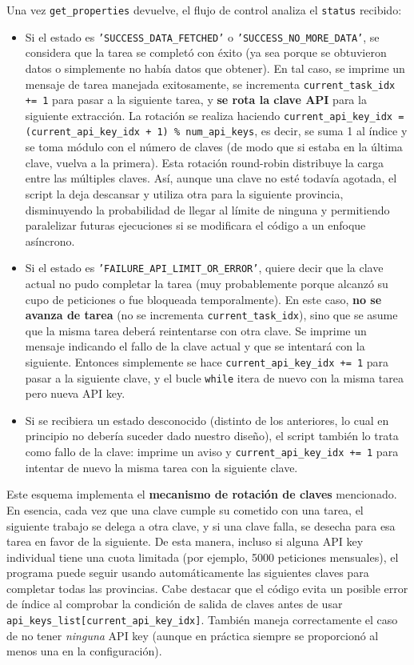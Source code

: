\documentclass[a4paper,11pt]{book}
\begin{document}
Una vez \texttt{get\_properties} devuelve, el flujo de control analiza el \texttt{status} recibido:
\begin{itemize}
    \item Si el estado es \texttt{'SUCCESS\_DATA\_FETCHED'} o \texttt{'SUCCESS\_NO\_MORE\_DATA'}, se considera que la tarea se completó con éxito (ya sea porque se obtuvieron datos o simplemente no había datos que obtener). En tal caso, se imprime un mensaje de tarea manejada exitosamente, se incrementa \texttt{current\_task\_idx += 1} para pasar a la siguiente tarea, y \textbf{se rota la clave API} para la siguiente extracción. La rotación se realiza haciendo \texttt{current\_api\_key\_idx = (current\_api\_key\_idx + 1) \% num\_api\_keys}, es decir, se suma 1 al índice y se toma módulo con el número de claves (de modo que si estaba en la última clave, vuelva a la primera). Esta rotación round-robin distribuye la carga entre las múltiples claves. Así, aunque una clave no esté todavía agotada, el script la deja descansar y utiliza otra para la siguiente provincia, disminuyendo la probabilidad de llegar al límite de ninguna y permitiendo paralelizar futuras ejecuciones si se modificara el código a un enfoque asíncrono.
    \item Si el estado es \texttt{'FAILURE\_API\_LIMIT\_OR\_ERROR'}, quiere decir que la clave actual no pudo completar la tarea (muy probablemente porque alcanzó su cupo de peticiones o fue bloqueada temporalmente). En este caso, \textbf{no se avanza de tarea} (no se incrementa \texttt{current\_task\_idx}), sino que se asume que la misma tarea deberá reintentarse con otra clave. Se imprime un mensaje indicando el fallo de la clave actual y que se intentará con la siguiente. Entonces simplemente se hace \texttt{current\_api\_key\_idx += 1} para pasar a la siguiente clave, y el bucle \texttt{while} itera de nuevo con la misma tarea pero nueva API key.
    \item Si se recibiera un estado desconocido (distinto de los anteriores, lo cual en principio no debería suceder dado nuestro diseño), el script también lo trata como fallo de la clave: imprime un aviso y \texttt{current\_api\_key\_idx += 1} para intentar de nuevo la misma tarea con la siguiente clave.
\end{itemize}

Este esquema implementa el \textbf{mecanismo de rotación de claves} mencionado. En esencia, cada vez que una clave cumple su cometido con una tarea, el siguiente trabajo se delega a otra clave, y si una clave falla, se desecha para esa tarea en favor de la siguiente. De esta manera, incluso si alguna API key individual tiene una cuota limitada (por ejemplo, 5000 peticiones mensuales), el programa puede seguir usando automáticamente las siguientes claves para completar todas las provincias. Cabe destacar que el código evita un posible error de índice al comprobar la condición de salida de claves antes de usar \texttt{api\_keys\_list[current\_api\_key\_idx]}. También maneja correctamente el caso de no tener \textit{ninguna} API key (aunque en práctica siempre se proporcionó al menos una en la configuración).
\end{document}
